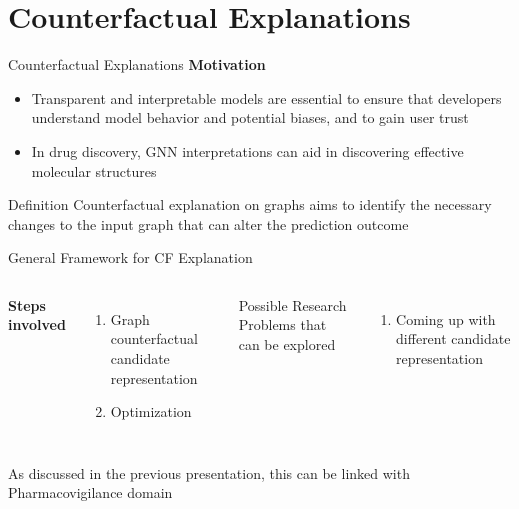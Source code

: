 \documentclass[aspectratio=169,xcolor=dvipsnames]{beamer}
\begin{document}
	\section{Counterfactual Explanations}
	\begin{frame}{Counterfactual Explanations}
		\textbf{Motivation}
		\begin{itemize}
			\item Transparent and interpretable models are essential to ensure that developers understand model behavior and potential biases, and to gain user trust
			\item In drug discovery, GNN interpretations can aid in discovering effective molecular structures
		\end{itemize}
		\begin{block}{Definition}
			Counterfactual explanation on graphs aims to identify the necessary changes to the input graph that can alter the prediction outcome
		\end{block}
	\end{frame}
	\begin{frame}{General Framework for CF Explanation}
		\begin{columns}[c] %
			
			\textbf{Steps involved}
			\begin{enumerate}
				\item Graph counterfactual candidate representation
				\item Optimization
			\end{enumerate}
			
			Possible Research Problems that can be explored
			\begin{enumerate}
				\item Coming up with different candidate representation
			\end{enumerate}
			
		\end{columns}
		
		\hfill
		
		As discussed in the previous presentation, this can be linked with Pharmacovigilance domain
	\end{frame}
\end{document}
